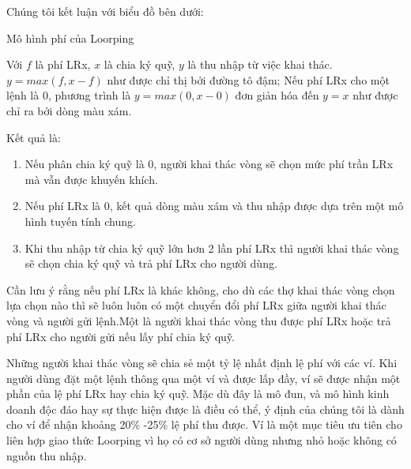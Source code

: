 \documentclass[12pt,a4paper]{article}
\makeatletter
\newenvironment{figurehere}
 {\def\@captype{figure}}
 {}
\makeatother
\begin{document}
\begin{multicols}{2}
Chúng tôi kết luận với biểu đồ bên dưới:
\begin{center}
\begin{figurehere}
\centering
{}
\caption{Mô hình phí của Loorping}
\label{fig:feemodel}
\end{figurehere}
\end{center}

Với $ f $ là phí LRx, $ x $ là chia ký quỹ, $ y $ là thu nhập từ việc khai thác.  $y=max(f, x-f)$ như được chỉ thị bởi đường tô đậm; Nếu phí LRx cho một lệnh là 0, phương trình là $y=max(0, x - 0)$ đơn giản hóa đến $y=x$ như được chỉ ra bởi dòng màu xám.

Kết quả là:
\begin{enumerate}
	\item Nếu phân chia ký quỹ là 0, người khai thác vòng sẽ chọn mức phí trần LRx mà vẫn được khuyến khích.
	\item Nếu phí LRx là 0, kết quả dòng màu xám và thu nhập được dựa trên một mô hình tuyến tính chung.
	\item Khi thu nhập từ chia ký quỹ lớn hơn 2 lần phí LRx thì người khai thác vòng sẽ chọn chia ký quỹ và trả phí LRx cho người dùng.
\end{enumerate}
Cần lưu ý rằng nếu phí LRx là khác không, cho dù các thợ khai thác vòng chọn lựa chọn nào thì sẽ luôn luôn có một chuyển đổi phí LRx giữa người khai thác vòng và người gửi lệnh.Một là người khai thác vòng thu được phí LRx hoặc trả phí LRx cho người gửi nếu lấy phí chia ký quỹ.

Những người khai thác vòng sẽ chia sẻ một tỷ lệ nhất định lệ phí với các ví. Khi người dùng đặt một lệnh thông qua một ví và được lấp đầy, ví sẽ được nhận một phần của lệ phí LRx hay chia ký quỹ. Mặc dù đây là mô đun, và mô hình kinh doanh độc đáo hay sự thực hiện được là điều có thể, ý định của chúng tôi là dành cho ví để nhận khoảng 20\% -25\% lệ phí thu được. Ví là một mục tiêu ưu tiên cho liên hợp giao thức Loorping vì họ có cơ sở người dùng nhưng nhỏ hoặc không có nguồn thu nhập.


\end{multicols}
\end{document}
